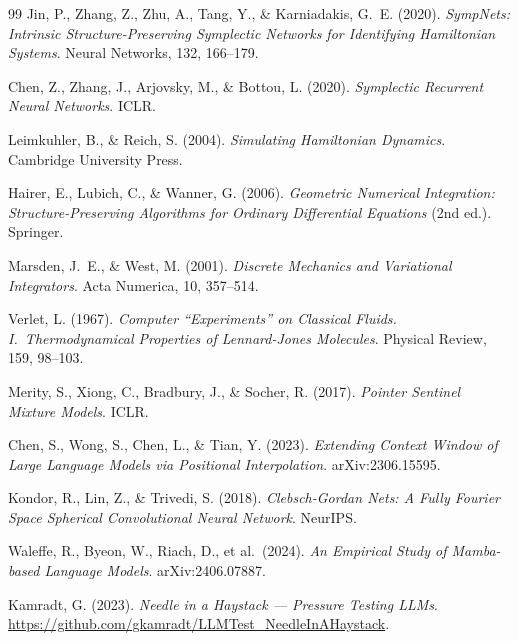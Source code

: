 \documentclass[11pt]{article}
\begin{document}
\begin{thebibliography}{99}
Jin, P., Zhang, Z., Zhu, A., Tang, Y., \& Karniadakis, G.~E. (2020).
\emph{SympNets: Intrinsic Structure-Preserving Symplectic Networks for
Identifying Hamiltonian Systems}.
Neural Networks, 132, 166--179.

Chen, Z., Zhang, J., Arjovsky, M., \& Bottou, L. (2020).
\emph{Symplectic Recurrent Neural Networks}.
ICLR.

Leimkuhler, B., \& Reich, S. (2004).
\emph{Simulating Hamiltonian Dynamics}.
Cambridge University Press.

Hairer, E., Lubich, C., \& Wanner, G. (2006).
\emph{Geometric Numerical Integration: Structure-Preserving Algorithms for
Ordinary Differential Equations} (2nd ed.).
Springer.

Marsden, J.~E., \& West, M. (2001).
\emph{Discrete Mechanics and Variational Integrators}.
Acta Numerica, 10, 357--514.

Verlet, L. (1967).
\emph{Computer ``Experiments'' on Classical Fluids. I.\ Thermodynamical
Properties of Lennard-Jones Molecules}.
Physical Review, 159, 98--103.

Merity, S., Xiong, C., Bradbury, J., \& Socher, R. (2017).
\emph{Pointer Sentinel Mixture Models}.
ICLR.

Chen, S., Wong, S., Chen, L., \& Tian, Y. (2023).
\emph{Extending Context Window of Large Language Models via Positional Interpolation}.
arXiv:2306.15595.

Kondor, R., Lin, Z., \& Trivedi, S. (2018).
\emph{Clebsch-Gordan Nets: A Fully Fourier Space Spherical Convolutional Neural Network}.
NeurIPS.

Waleffe, R., Byeon, W., Riach, D., et al.\ (2024).
\emph{An Empirical Study of Mamba-based Language Models}.
arXiv:2406.07887.

Kamradt, G. (2023).
\emph{Needle in a Haystack — Pressure Testing LLMs}.
\url{https://github.com/gkamradt/LLMTest_NeedleInAHaystack}.

\end{thebibliography}
\end{document}

